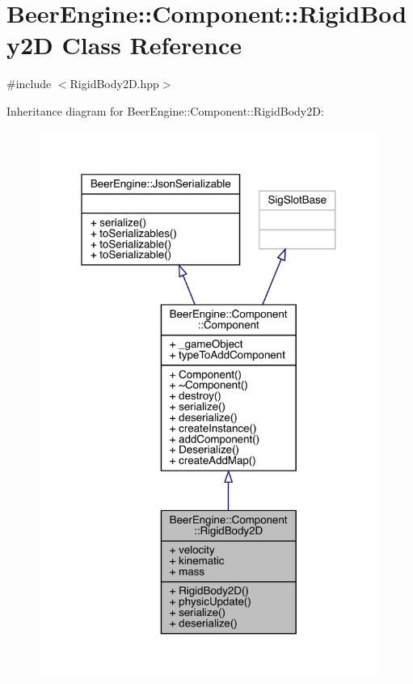 \hypertarget{class_beer_engine_1_1_component_1_1_rigid_body2_d}{}\section{Beer\+Engine\+:\+:Component\+:\+:Rigid\+Body2D Class Reference}
\label{class_beer_engine_1_1_component_1_1_rigid_body2_d}


{\ttfamily \#include $<$Rigid\+Body2\+D.\+hpp$>$}



Inheritance diagram for Beer\+Engine\+:\+:Component\+:\+:Rigid\+Body2D\+:\nopagebreak
\begin{figure}[H]
\begin{center}
\leavevmode
\includegraphics[width=316pt]{class_beer_engine_1_1_component_1_1_rigid_body2_d__inherit__graph}
\end{center}
\end{figure}


